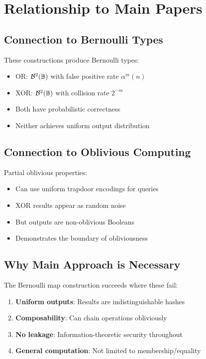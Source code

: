 \documentclass[11pt,final,hidelinks]{article}
\begin{document}
\section{Relationship to Main Papers}

\subsection{Connection to Bernoulli Types}

These constructions produce Bernoulli types:
\begin{itemize}
    \item OR: $\mathcal{B}^{2}(\mathbb{B})$ with false positive rate $\alpha^m(n)$
    \item XOR: $\mathcal{B}^{2}(\mathbb{B})$ with collision rate $2^{-m}$
    \item Both have probabilistic correctness
    \item Neither achieves uniform output distribution
\end{itemize}

\subsection{Connection to Oblivious Computing}

Partial oblivious properties:
\begin{itemize}
    \item Can use uniform trapdoor encodings for queries
    \item XOR results appear as random noise
    \item But outputs are non-oblivious Booleans
    \item Demonstrates the boundary of obliviousness
\end{itemize}

\subsection{Why Main Approach is Necessary}

The Bernoulli map construction succeeds where these fail:
\begin{enumerate}
    \item \textbf{Uniform outputs}: Results are indistinguishable hashes
    \item \textbf{Composability}: Can chain operations obliviously
    \item \textbf{No leakage}: Information-theoretic security throughout
    \item \textbf{General computation}: Not limited to membership/equality
\end{enumerate}
\end{document}
